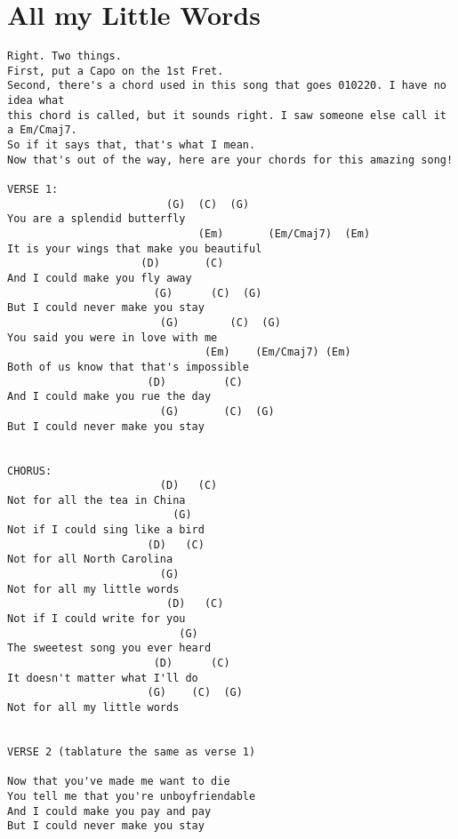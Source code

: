 \documentclass[leqno]{memoir}
\begin{document}
\chapter{All my Little Words}
\begin{verbatim}
Right. Two things.
First, put a Capo on the 1st Fret.
Second, there's a chord used in this song that goes 010220. I have no idea what 
this chord is called, but it sounds right. I saw someone else call it a Em/Cmaj7. 
So if it says that, that's what I mean. 
Now that's out of the way, here are your chords for this amazing song!
                        
VERSE 1:     
                         (G)  (C)  (G)
You are a splendid butterfly
                              (Em)       (Em/Cmaj7)  (Em)
It is your wings that make you beautiful
                     (D)       (C)
And I could make you fly away
                       (G)      (C)  (G)
But I could never make you stay
                        (G)        (C)  (G)
You said you were in love with me
                               (Em)    (Em/Cmaj7) (Em)
Both of us know that that's impossible
                      (D)         (C)       
And I could make you rue the day
                        (G)       (C)  (G)
But I could never make you stay

                       
CHORUS:           
                        (D)   (C)
Not for all the tea in China
                          (G)
Not if I could sing like a bird
                      (D)   (C)    
Not for all North Carolina
                        (G)
Not for all my little words
                         (D)   (C)
Not if I could write for you
                           (G)
The sweetest song you ever heard
                       (D)      (C)
It doesn't matter what I'll do
                      (G)    (C)  (G)
Not for all my little words


VERSE 2 (tablature the same as verse 1)

Now that you've made me want to die
You tell me that you're unboyfriendable
And I could make you pay and pay
But I could never make you stay
\end{verbatim}
\newpage
\end{document}
